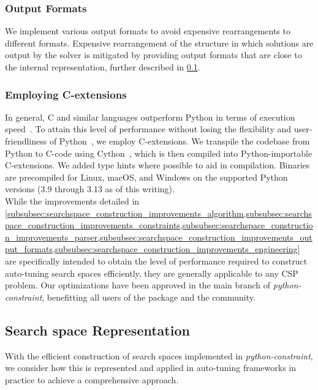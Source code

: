 \subsubsection{Output Formats} \label{subsubsec:searchspace_construction_improvements_output_formats}
We implement various output formats to avoid expensive rearrangements to different formats. 
Expensive rearrangement of the structure in which solutions are output by the solver is mitigated by providing output formats that are close to the internal representation, further described in \cref{subsec:searchspace_construction_searchspace_object}.

\subsubsection{Employing C-extensions} \label{subsubsec:searchspace_construction_improvements_engineering}
In general, C and similar languages outperform Python in terms of execution speed~\cite{pythonVSC,comparingSixLanguages}. To attain this level of performance without losing the flexibility and user-friendliness of Python~\cite{pythonVSC++usability}, we employ C-extensions. 
We transpile the codebase from Python to C-code using Cython~\cite{behnelCythonBestBoth2011}, which is then compiled into Python-importable C-extensions. 
We added type hints where possible to aid in compilation. 
Binaries are precompiled for Linux, macOS, and Windows on the supported Python versions (3.9 through 3.13 as of this writing). \\

While the improvements detailed in \cref{subsubsec:searchspace_construction_improvements_algorithm,subsubsec:searchspace_construction_improvements_constraints,subsubsec:searchspace_construction_improvements_parser,subsubsec:searchspace_construction_improvements_output_formats,subsubsec:searchspace_construction_improvements_engineering} are specifically intended to obtain the level of performance required to construct auto-tuning search spaces efficiently, they are generally applicable to any CSP problem. 
Our optimizations have been approved in the main branch of \textit{python-constraint}, benefitting all users of the package and the community. 

\subsection{Search space Representation} \label{subsec:searchspace_construction_searchspace_object}
With the efficient construction of search spaces implemented in \textit{python-constraint}, we consider how this is represented and applied in auto-tuning frameworks in practice to achieve a comprehensive approach. 

